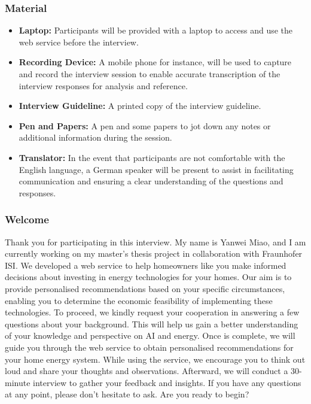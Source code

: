 \subsubsection{Material}

\begin{itemize}
  \item \textbf{Laptop:} Participants will be provided with a laptop to access and use the web service before the interview. 
  \item \textbf{Recording Device:} A mobile phone for instance, will be used to capture and record the interview session to enable accurate transcription of the interview responses for analysis and reference.
  \item \textbf{Interview Guideline:} A printed copy of the interview guideline.
  \item \textbf{Pen and Papers:} A pen and some papers to jot down any notes or additional information during the session. 
  \item \textbf{Translator:} In the event that participants are not comfortable with the English language, a German speaker will be present to assist in facilitating communication and ensuring a clear understanding of the questions and responses.
\end{itemize}


\subsubsection{Welcome}

Thank you for participating in this interview. 
My name is Yanwei Miao, and I am currently working on my master's thesis project in collaboration with Fraunhofer ISI.
We developed a web service to help homeowners like you make informed decisions about investing in energy technologies for your homes. 
Our aim is to provide personalised recommendations based on your specific circumstances, enabling you to determine the economic feasibility of implementing these technologies. 
To proceed, we kindly request your cooperation in answering a few questions about your background. 
This will help us gain a better understanding of your knowledge and perspective on AI and energy. 
Once is complete, we will guide you through the web service to obtain personalised recommendations for your home energy system. 
While using the service, we encourage you to think out loud and share your thoughts and observations. 
Afterward, we will conduct a 30-minute interview to gather your feedback and insights. 
If you have any questions at any point, please don't hesitate to ask. 
Are you ready to begin?


